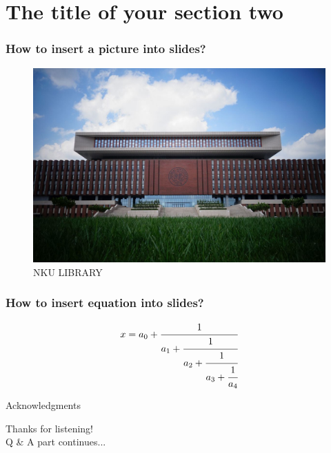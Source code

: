 \documentclass[11pt, dvipsnames]{beamer}
\begin{document}
	\section{The title of your section two}
	\begin{frame}
		\frametitle{How to insert a picture into slides?}
		\begin{figure}
			\centering
			\includegraphics[width=0.7\linewidth]{nkulib}
			\caption{NKU LIBRARY}
			\label{fig:nkulib}
		\end{figure}
		
		\end{frame}
	\begin{frame}
		\frametitle{How to insert equation into slides?}
		\begin{equation}
			x = a_0 + \cfrac{1}{a_1 
				+ \cfrac{1}{a_2 
					+ \cfrac{1}{a_3 + \cfrac{1}{a_4} } } }
		\end{equation}
	\end{frame}
	\begin{frame}{Acknowledgments}
		\begin{center}
			{
				\Large 
				Thanks for listening! \\ 
				\bigskip
				Q \& A part continues...
			}
		\end{center}
	\end{frame}
	
\end{document}
